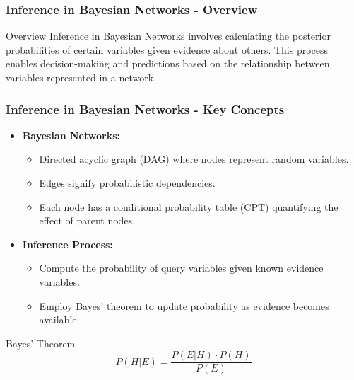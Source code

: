 \documentclass[aspectratio=169]{beamer}
\begin{document}
\begin{frame}[fragile]
    \frametitle{Inference in Bayesian Networks - Overview}
    \begin{block}{Overview}
        Inference in Bayesian Networks involves calculating the posterior probabilities of certain variables given evidence about others. 
        This process enables decision-making and predictions based on the relationship between variables represented in a network.
    \end{block}
\end{frame}

\begin{frame}[fragile]
    \frametitle{Inference in Bayesian Networks - Key Concepts}
    \begin{itemize}
        \item \textbf{Bayesian Networks:}
        \begin{itemize}
            \item Directed acyclic graph (DAG) where nodes represent random variables.
            \item Edges signify probabilistic dependencies.
            \item Each node has a conditional probability table (CPT) quantifying the effect of parent nodes.
        \end{itemize}
        
        \item \textbf{Inference Process:}
        \begin{itemize}
            \item Compute the probability of query variables given known evidence variables.
            \item Employ Bayes' theorem to update probability as evidence becomes available.
        \end{itemize}
    \end{itemize}
    
    \begin{block}{Bayes' Theorem}
        \[
        P(H|E) = \frac{P(E|H) \cdot P(H)}{P(E)}
        \]
    \end{block}
\end{frame}
\end{document}
